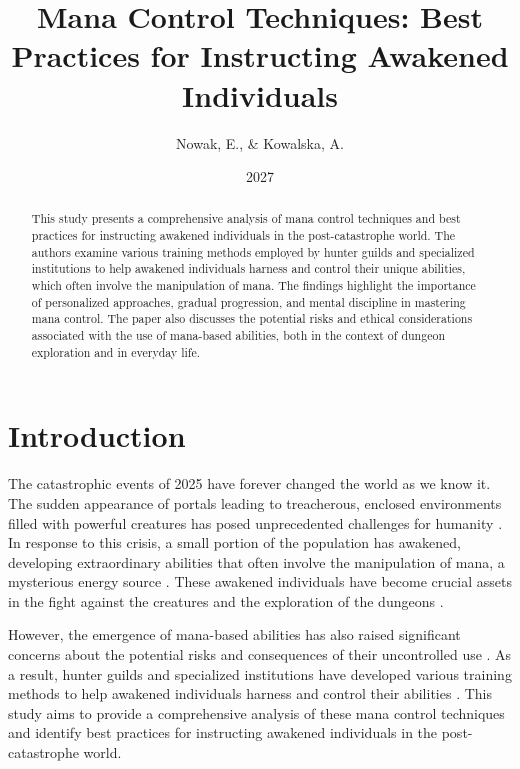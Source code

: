 \documentclass[12pt, a4paper]{article}
\begin{document}
\title{Mana Control Techniques: Best Practices for Instructing Awakened Individuals}
\author{Nowak, E., \& Kowalska, A.}
\date{2027}

\maketitle

\begin{abstract}
This study presents a comprehensive analysis of mana control techniques and best practices for instructing awakened individuals in the post-catastrophe world. The authors examine various training methods employed by hunter guilds and specialized institutions to help awakened individuals harness and control their unique abilities, which often involve the manipulation of mana. The findings highlight the importance of personalized approaches, gradual progression, and mental discipline in mastering mana control. The paper also discusses the potential risks and ethical considerations associated with the use of mana-based abilities, both in the context of dungeon exploration and in everyday life.
\end{abstract}

\section{Introduction}
The catastrophic events of 2025 have forever changed the world as we know it. The sudden appearance of portals leading to treacherous, enclosed environments filled with powerful creatures has posed unprecedented challenges for humanity \cite{Nakamura2026}. In response to this crisis, a small portion of the population has awakened, developing extraordinary abilities that often involve the manipulation of mana, a mysterious energy source \cite{Lee2026}. These awakened individuals have become crucial assets in the fight against the creatures and the exploration of the dungeons \cite{Kim2026}.

However, the emergence of mana-based abilities has also raised significant concerns about the potential risks and consequences of their uncontrolled use \cite{Chen2026}. As a result, hunter guilds and specialized institutions have developed various training methods to help awakened individuals harness and control their abilities \cite{Muller2026}. This study aims to provide a comprehensive analysis of these mana control techniques and identify best practices for instructing awakened individuals in the post-catastrophe world.
\end{document}
